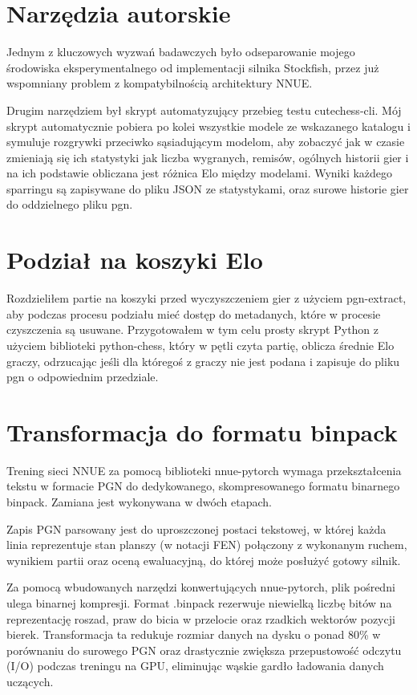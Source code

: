\documentclass[12pt,a4paper]{report}
\begin{document}
\section{Narzędzia autorskie}

Jednym z kluczowych wyzwań badawczych było odseparowanie mojego środowiska eksperymentalnego od implementacji silnika Stockfish, przez już wspomniany problem z kompatybilnością architektury NNUE.

Drugim narzędziem był skrypt automatyzujący przebieg testu cutechess-cli. Mój skrypt automatycznie pobiera po kolei wszystkie modele ze wskazanego katalogu i symuluje rozgrywki przeciwko sąsiadującym modelom, aby zobaczyć jak w czasie zmieniają się ich statystyki jak liczba wygranych, remisów, ogólnych historii gier i na ich podstawie obliczana jest różnica Elo między modelami. Wyniki każdego sparringu są zapisywane do pliku JSON ze statystykami, oraz surowe historie gier do oddzielnego pliku pgn.

\section{Podział na koszyki Elo}

Rozdzieliłem partie na koszyki przed wyczyszczeniem gier z użyciem pgn-extract, aby podczas procesu podziału mieć dostęp do metadanych, które w procesie czyszczenia są usuwane. Przygotowałem w tym celu prosty skrypt Python z użyciem biblioteki python-chess, który w pętli czyta partię, oblicza średnie Elo graczy, odrzucając jeśli dla któregoś z graczy nie jest podana i zapisuje do pliku pgn o odpowiednim przedziale.

\section{Transformacja do formatu binpack}

Trening sieci NNUE za pomocą biblioteki nnue-pytorch wymaga przekształcenia tekstu w formacie PGN do dedykowanego, skompresowanego formatu binarnego binpack. Zamiana jest wykonywana w dwóch etapach.

Zapis PGN parsowany jest do uproszczonej postaci tekstowej, w której każda linia reprezentuje stan planszy (w notacji FEN) połączony z wykonanym ruchem, wynikiem partii oraz oceną ewaluacyjną, do której może posłużyć gotowy silnik.

Za pomocą wbudowanych narzędzi konwertujących nnue-pytorch, plik pośredni ulega binarnej kompresji. Format .binpack rezerwuje niewielką liczbę bitów na reprezentację roszad, praw do bicia w przelocie oraz rzadkich wektorów pozycji bierek.
Transformacja ta redukuje rozmiar danych na dysku o ponad 80\% w porównaniu do surowego PGN oraz drastycznie zwiększa przepustowość odczytu (I/O) podczas treningu na GPU, eliminując wąskie gardło ładowania danych uczących.
\end{document}
